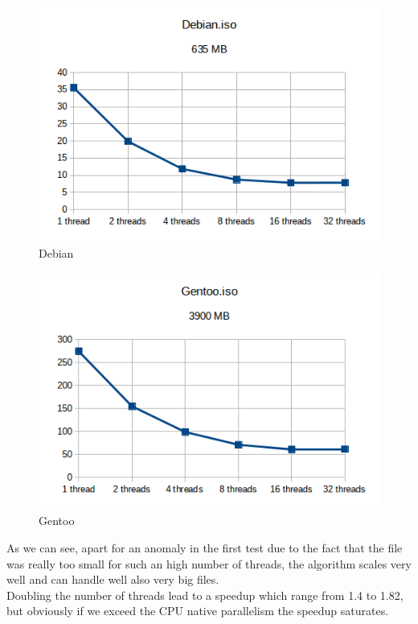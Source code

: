 \begin{figure}[H]
\centering
\includegraphics[scale = 0.8]{./Pictures/Debian} %
\caption{Debian}
\label{fig:Debian}
\end{figure}

\begin{figure}[H]
\centering
\includegraphics[scale = 0.8]{./Pictures/Gentoo} %
\caption{Gentoo}
\label{fig:Gentoo}
\end{figure}

As we can see, apart for an anomaly in the first test due to the fact that the file was really too small for such an high number of threads, the algorithm scales very well and can handle well also very big files.\\
Doubling the number of threads lead to a speedup which range from 1.4 to 1.82, but obviously if we exceed the CPU native parallelism the speedup saturates.

